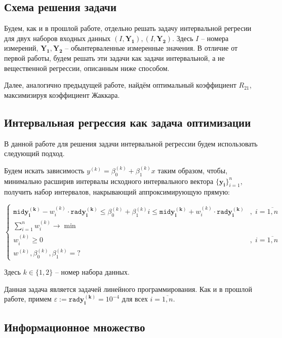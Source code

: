 \subsection{Схема решения задачи}
Будем, как и в прошлой работе, отдельно решать задачу интервальной регресии для двух наборов входных данных $(I, \mathbf{Y_1}), (I, \mathbf{Y_2})$. Здесь $I$ -- номера измерений, $\mathbf{Y_1}, \mathbf{Y_2}$ -- обынтерваленные измеренные значения. В отличие от первой работы, будем решать эти задачи как задачи интервальной, а не вещественной регрессии, описанным ниже способом.

Далее, аналогично предыдущей работе, найдём оптимальный коэффициент $R_{21}$, максимизируя коэффициент Жаккара.

\subsection{Интервальная регрессия как задача оптимизации}
В данной работе для решения задачи интервальной регрессии будем использовать следующий подход.

Будем искать зависимость $y^{(k)} = \beta_0^{(k)} + \beta_1^{(k)}x$ таким образом, чтобы, минимально расширив интервалы исходного интервального вектора $\{\mathbf{y_i}\}_{i=1}^{n}$, получить набор интервалов, накрывающий аппроксимирующую прямую:

\begin{equation} \label{regropt}
\begin{cases}
\mathtt{mid} \mathbf{y^{(k)}_i} - w^{(k)}_i \cdot \mathtt{rad} \mathbf{y^{(k)}_i} \leq \beta_0^{(k)} + \beta_1^{(k)} i \leq \mathtt{mid} \mathbf{y^{(k)}_i} + w^{(k)}_i \cdot \mathtt{rad} \mathbf{y^{(k)}_i} & , \; i = \overline{1, n}\\
\displaystyle\sum_{i=1}^{n} w_i^{(k)} \longrightarrow \min & \\
w_i^{(k)} \geq 0 & , \; i = \overline{1, n} \\
w^{(k)}, \beta_0^{(k)}, \beta_1^{(k)} = ? &
\end{cases}
\end{equation}

Здесь $k \in \{1, 2\}$ -- номер набора данных.

Данная задача является задачей линейного программирования. Как и в прошлой работе, примем $\varepsilon := \mathtt{rad} \mathbf{y_i^{(k)}} = 10^{-4}$ для всех $i = \overline{1, n}$.

\subsection{Информационное множество}

